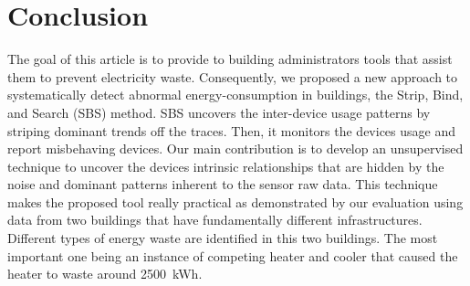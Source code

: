 \section{Conclusion}
The goal of this article is to provide to building administrators tools that assist them to prevent electricity waste.
Consequently, we proposed a new approach to systematically detect abnormal energy-consumption in buildings, the Strip, Bind, and Search (SBS) method.
SBS uncovers the inter-device usage patterns by striping dominant trends off the traces.
Then, it monitors the devices usage and report misbehaving devices.
Our main contribution is to develop an unsupervised technique to uncover the devices intrinsic relationships that are hidden by the noise and dominant patterns inherent to the sensor raw data.
This technique makes the proposed tool really practical as demonstrated by our evaluation using data from two buildings that have fundamentally different infrastructures.
Different types of energy waste are identified in this two buildings. 
The most important one being an instance of competing heater and cooler that caused the heater to waste around 2500~kWh.



